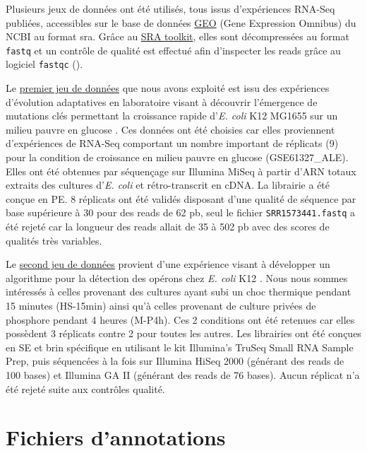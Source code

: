 \documentclass[12pt,a4paper]{report}
\begin{document}
\begin{onehalfspace}
Plusieurs jeux de données ont été utilisés, tous issus d'expériences RNA-Seq publiées, accessibles sur le base de données \href{http://www.ncbi.nlm.nih.gov/geo/}{GEO} (Gene Expression Omnibus) du NCBI au format \gls{sra}. Grâce au \href{http://www.ncbi.nlm.nih.gov/books/NBK158900/#SRA_download.how_do_i_use_the_sra_toolki}{SRA toolkit}, elles sont décompressées au format \texttt{fastq} et un contrôle de qualité est effectué afin d'inspecter les reads grâce au logiciel \texttt{fastqc} ().

Le \href{http://www.ncbi.nlm.nih.gov/geo/query/acc.cgi?acc=GSE61327}{premier jeu de données} que nous avons exploité est issu des expériences d'évolution adaptatives en laboratoire visant à découvrir l'émergence de mutations clés permettant la croissance rapide d'\textit{E. coli} K12 MG1655 sur un milieu pauvre en glucose \citep{Lacroix2014}. Ces données ont été choisies car elles proviennent d'expériences de RNA-Seq comportant un nombre important de réplicats (9) pour la condition de croissance en milieu pauvre en glucose (GSE61327\_ALE). Elles ont été obtenues par séquençage sur Illumina MiSeq à partir d'ARN totaux extraits des cultures d'\textit{E. coli} et rétro-transcrit en cDNA. La librairie a été conçue en \gls{PE}. 8 réplicats ont été validés disposant d'une qualité de séquence par base supérieure à 30 pour des reads de 62 pb, seul le fichier \texttt{SRR1573441.fastq} a été rejeté car la longueur des reads allait de 35 à 502 pb avec des scores de qualités très variables.

Le \href{http://bioinfolab.uncc.edu/TruHmm_package/raw_data/}{second jeu de données} provient d'une expérience visant à développer un algorithme pour la détection des opérons chez \textit{E. coli} K12 \citep{Li2013}. Nous nous sommes intéressés à celles provenant des cultures ayant subi un choc thermique pendant 15 minutes (HS-15min) ainsi qu'à celles provenant de culture privées de phosphore pendant 4 heures (M-P4h). Ces 2 conditions ont été retenues car elles possèdent 3 réplicats contre 2 pour toutes les autres. Les librairies ont été conçues en \gls{SE} et brin spécifique en utilisant le kit Illumina’s TruSeq Small RNA Sample Prep, puis séquencées à la fois sur Illumina HiSeq 2000 (générant des reads de 100 bases) et Illumina GA II (générant des reads de 76 bases). Aucun réplicat n'a été rejeté suite aux contrôles qualité.

\section*{Fichiers d'annotations}


\end{onehalfspace}
\end{document}
